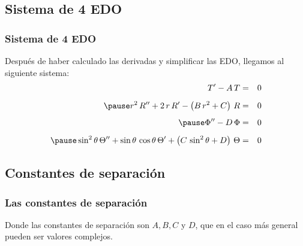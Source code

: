 \documentclass[12pt]{beamer}
\begin{document}
\subsection{Sistema de 4 EDO}
\begin{frame}
\frametitle{Sistema de 4 EDO}
Después de haber calculado las derivadas y simplificar las EDO, llegamos al siguiente sistema:
\fontsize{12}{12}\selectfont
\begin{eqnarray}
\pderivada{T} - A \, T &=&0 \label{eq:ecuacion_02_300} \\[0.5em] \pause
r^{2} \, \sderivada{R} + 2 \, r \, \pderivada{R} - \left( B \, r^{2} + C \right) \, R &=& 0 \label{eq:ecuacion_02_301} \\[0.5em] \pause
\sderivada{\Phi} - D \, \Phi &=& 0 \label{eq:ecuacion_02_302} \\[0.5em] \pause
\sin^{2} \theta \, \sderivada{\Theta} + \sin \theta \, \cos \theta \, \pderivada{\Theta} + \left( C \, \sin^{2} \theta + D \right) \, \Theta &=& 0 \label{eq:ecuacion_02_303}
\end{eqnarray}
\end{frame}
\subsection*{Constantes de separación}
\begin{frame}
\frametitle{Las constantes de separación}
Donde las constantes de separación son $A, B, C$ y $D$, que en el caso más general pueden ser valores complejos.
\end{frame}
\end{document}
